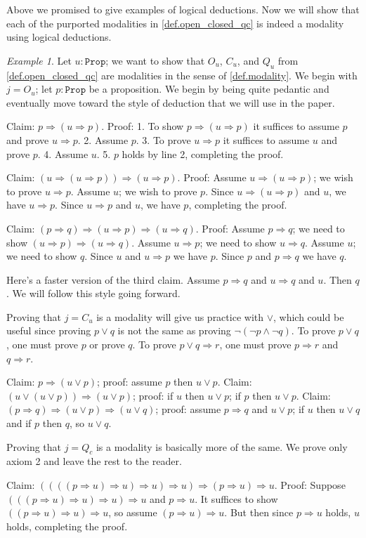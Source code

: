 \documentclass[11pt, oneside, article]{memoir}
\theoremstyle{plain}
\theoremstyle{definition}
\theoremstyle{remark}
\newtheorem{example}[theorem]{Example}
\newcommand{\const}[1]{\mathtt{#1}}
\newcommand{\prop}{\const{Prop}}
\newcommand{\imp}{\Rightarrow}
\begin{document}
Above we promised to give examples of logical deductions. Now we will show that each of the purported modalities in \cref{def.open_closed_qc} is indeed a modality using logical deductions.

\begin{example}\label{ex.modality_deduction}
Let $u:\prop$; we want to show that $O_u$, $C_u$, and $Q_u$ from \cref{def.open_closed_qc} are modalities in the sense of \cref{def.modality}. We begin with $j=O_u$; let $p:\prop$ be a proposition. We begin by being quite pedantic and eventually move toward the style of deduction that we will use in the paper.

Claim: $p\imp (u\imp p)$. Proof: 1. To show $p\imp (u\imp p)$ it suffices to assume $p$ and prove $u\imp p$. 2. Assume $p$. 3. To prove $u\imp p$ it suffices to assume $u$ and prove $p$. 4. Assume $u$. 5. $p$ holds by line 2, completing the proof.

Claim: $(u\imp(u\imp p))\imp (u\imp p)$. Proof: Assume $u\imp (u\imp p)$; we wish to prove $u\imp p$. Assume $u$; we wish to prove $p$. Since $u\imp (u\imp p)$ and $u$, we have $u\imp p$. Since $u\imp p$ and $u$, we have $p$, completing the proof.

Claim: $(p\imp q)\imp (u\imp p)\imp (u\imp q)$. Proof: Assume $p\imp q$; we need to show $(u\imp p)\imp (u\imp q)$. Assume $u\imp p$; we need to show $u\imp q$. Assume $u$; we need to show $q$. Since $u$ and $u\imp p$ we have $p$. Since $p$ and $p\imp q$ we have $q$.

Here's a faster version of the third claim. Assume $p\imp q$ and $u\imp q$ and $u$. Then $q$. We will follow this style going forward.

Proving that $j=C_u$ is a modality will give us practice with $\vee$, which could be useful since proving $p\vee q$ is not the same as proving $\neg(\neg p\wedge\neg q)$. To prove $p\vee q$, one must prove $p$ or prove $q$. To prove $p\vee q \imp r$, one must prove $p\imp r$ and $q\imp r$.

Claim: $p\imp (u\vee p)$; proof: assume $p$ then $u\vee p$. Claim: $(u\vee (u\vee p))\imp (u\vee p)$; proof: if $u$ then $u\vee p$; if $p$ then $u\vee p$. Claim: $(p\imp q)\imp (u\vee p)\imp (u\vee q)$; proof: assume $p\imp q$ and $u\vee p$; if $u$ then $u\vee q$ and if $p$ then $q$, so $u\vee q$.

Proving that $j=Q_c$ is a modality is basically more of the same. We prove only axiom 2 and leave the rest to the reader.

Claim: $((((p\imp u)\imp u)\imp u)\imp u)\imp (p\imp u)\imp u$. Proof: Suppose $(((p\imp u)\imp u)\imp u)\imp u$ and $p\imp u$. It suffices to show $((p\imp u)\imp u)\imp u$, so assume $(p\imp u)\imp u$. But then since $p\imp u$ holds, $u$ holds, completing the proof.
\end{example}
\end{document}
